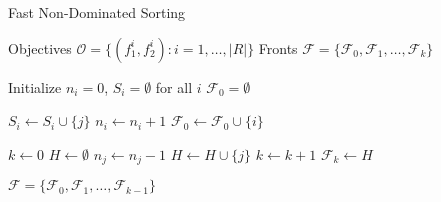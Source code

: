 \documentclass{article}
\begin{document}
\vspace{1em}

\begin{algorithm}
\caption{Fast Non-Dominated Sorting}
\label{alg:fast-nondom-sort}
\begin{algorithmic}[1]
\REQUIRE Objectives $\mathcal{O} = \{(f_1^i, f_2^i) : i = 1, \ldots, |R|\}$
\ENSURE Fronts $\mathcal{F} = \{\mathcal{F}_0, \mathcal{F}_1, \ldots, \mathcal{F}_k\}$

\STATE Initialize $n_i = 0$, $S_i = \emptyset$ for all $i$ 
\STATE $\mathcal{F}_0 = \emptyset$ 

         
            \STATE $S_i \leftarrow S_i \cup \{j\}$
         
            \STATE $n_i \leftarrow n_i + 1$
        \ENDIF
    \ENDFOR
     
        \STATE $\mathcal{F}_0 \leftarrow \mathcal{F}_0 \cup \{i\}$
    \ENDIF
\ENDFOR

\STATE $k \leftarrow 0$
    \STATE $H \leftarrow \emptyset$ 
            \STATE $n_j \leftarrow n_j - 1$
                \STATE $H \leftarrow H \cup \{j\}$
            \ENDIF
        \ENDFOR
    \ENDFOR
    \STATE $k \leftarrow k + 1$
    \STATE $\mathcal{F}_k \leftarrow H$
\ENDWHILE

\RETURN $\mathcal{F} = \{\mathcal{F}_0, \mathcal{F}_1, \ldots, \mathcal{F}_{k-1}\}$

\end{algorithmic}
\end{algorithm}

\vspace{1em}
\end{document}
